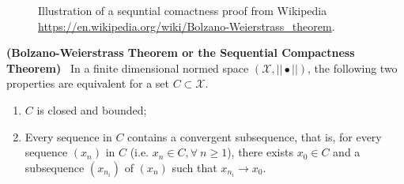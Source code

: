 \begin{figure}[hbt!]%
    \caption[]{ Illustration of a sequntial comactness proof from Wikipedia \url{https://en.wikipedia.org/wiki/Bolzano-Weierstrass_theorem}.}
    \label{fig:BolzanoWeirstrassProof}
\end{figure} 


\begin{thm} 
\label{thm:BolWeir}
\textbf{(Bolzano-Weierstrass Theorem or the Sequential Compactness Theorem)}~ In a finite dimensional normed space $(\mathcal{X}, ||  \bullet ||)$,
the following two properties are equivalent for a set $C \subset \mathcal{X}$.
\renewcommand{\labelenumi}{(\alph{enumi})}
\begin{enumerate}
\item $C$ is closed and bounded;
\item Every sequence in $C$ contains a convergent subsequence, that is, for every sequence $(x_n)$ in $C$ (i.e. $x_n \in C, \forall~n\ge 1$), there exists $x_0 \in C$ and a subsequence
$(x_{n_i})$ of $(x_n)$ such that $x_{n_i} \to x_0$.
\end{enumerate}
\end{thm}

